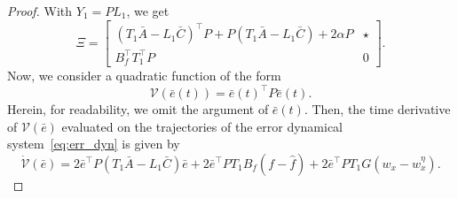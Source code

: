 \documentclass[times, doublespace]{rncauth}
\begin{document}
\begin{proof}
With $Y_1 = PL_1$, we get
\[
\Xi=\begin{bmatrix}
(T_1 \bar A - L_1\bar C)^\top P + P (T_1 \bar A - L_1 \bar C) + 2\alpha P & \star\\
B_f^\top T_1^\top P & 0 
\end{bmatrix}.
\]
Now, we consider a quadratic function of the form $$\mathcal V(\bar e(t)) =\bar e(t)^\top P\bar e(t).$$ Herein, for readability, we omit the argument of $\bar e(t)$. Then, the time derivative of $\mathcal V(\bar e)$ evaluated on the trajectories of the error dynamical system~\eqref{eq:err_dyn} is given by
	\begin{equation*}
	\dot{\mathcal V}(\bar e)= 2\bar e^\top P (T_1 \bar A -L_1\bar C) \bar e + 2 \bar e^\top P T_1 B_f (f-\hat f) + 2\bar e^\top PT_1G (w_x-\hat w^\eta_x).
	\end{equation*}
	

\end{proof}
\end{document}
